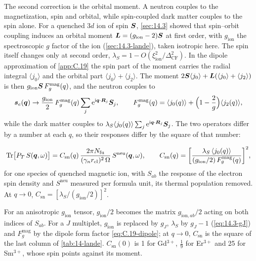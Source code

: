The second correction is the orbital moment. A neutron couples to the magnetization, spin and orbital, while spin-coupled dark matter couples to the spin alone. For a quenched $3d$ ion of spin $\bm{S}$, \cref{sec:14.3} showed that spin--orbit coupling induces an orbital moment $\bm{L} = (g_{\mathrm{ion}} - 2)\bm{S}$ at first order, with $g_{\mathrm{ion}}$ the spectroscopic $g$ factor of the ion (\cref{sec:14.3-lande}), taken isotropic here. The spin itself changes only at second order, $\lambda_S = 1 - O(\xi_{\mathrm{ion}}^2/\Delta_{\mathrm{CF}}^2)$. In the dipole approximation of \cref{app:C.19} the spin part of the moment carries the radial integral $\langle j_0\rangle$ and the orbital part $\langle j_0\rangle + \langle j_2\rangle$. The moment $2\bm{S}\langle j_0\rangle + \bm{L}(\langle j_0\rangle + \langle j_2\rangle)$ is then $g_{\mathrm{ion}}\bm{S}\,F^{\mathrm{mag}}_g(q)$, and the neutron couples to
\begin{equation*}
  \bm{s}_e(\bm{q}) \to \frac{g_{\mathrm{ion}}}{2}\,F^{\mathrm{mag}}_g(q)\sum_j\mathrm{e}^{\mathrm{i}\bm{q}\cdot\bm{R}_j}\bm{S}_j, \qquad F^{\mathrm{mag}}_g(q) = \langle j_0(q)\rangle + \Bigl(1 - \frac2g\Bigr)\langle j_2(q)\rangle ,
\end{equation*}
while the dark matter couples to $\lambda_S\langle j_0(q)\rangle\sum_j\mathrm{e}^{\mathrm{i}\bm{q}\cdot\bm{R}_j}\bm{S}_j$. The two operators differ by a number at each $q$, so their responses differ by the square of that number:
\begin{keyresult}
\begin{equation}
  \operatorname{Tr}\bigl[P_T\,S(\bm{q},\omega)\bigr] = C_{\mathrm{sn}}(q)\,\frac{2\pi N_{\mathrm{fu}}}{(\gamma_nr_{\mathrm{cl}})^2\,\Omega}\,S^{\mathrm{neu}}(\bm{q},\omega), \qquad
  C_{\mathrm{sn}}(q) = \biggl[\frac{\lambda_S\,\langle j_0(q)\rangle}{(g_{\mathrm{ion}}/2)\,F^{\mathrm{mag}}_g(q)}\biggr]^2 ,
  \label{eq:14.4-data}
\end{equation}
for one species of quenched magnetic ion, with $S_{ab}$ the response of the electron spin density and $S^{\mathrm{neu}}$ measured per formula unit, its thermal population removed. At $q \to 0$, $C_{\mathrm{sn}} = [\lambda_S/(g_{\mathrm{ion}}/2)]^2$.
\end{keyresult}
\noindent For an anisotropic $g_{\mathrm{ion}}$ tensor, $g_{\mathrm{ion}}/2$ becomes the matrix $g_{\mathrm{ion},ab}/2$ acting on both indices of $S_{ab}$. For a $J$ multiplet, $g_{\mathrm{ion}}$ is replaced by $g_J$, $\lambda_S$ by $g_J - 1$ (\cref{eq:14.3-gJ}) and $F^{\mathrm{mag}}_g$ by the dipole form factor \cref{eq:C.19-dipole}; at $q \to 0$, $C_{\mathrm{sn}}$ is the square of the last column of \cref{tab:14-lande}. $C_{\mathrm{sn}}(0)$ is 1 for Gd$^{3+}$, $\frac19$ for Er$^{3+}$ and 25 for Sm$^{3+}$, whose spin points against its moment.

